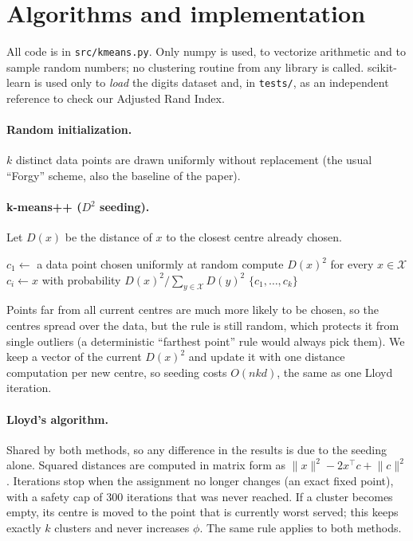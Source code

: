 \documentclass[11pt,a4paper]{article}
\begin{document}
\section{Algorithms and implementation}

All code is in \texttt{src/kmeans.py}. Only numpy is used, to vectorize
arithmetic and to sample random numbers; no clustering routine from any library
is called. scikit-learn is used only to \emph{load} the digits dataset and, in
\texttt{tests/}, as an independent reference to check our Adjusted Rand Index.

\paragraph{Random initialization.} $k$ distinct data points are drawn uniformly
without replacement (the usual ``Forgy'' scheme, also the baseline of the paper).

\paragraph{k-means++ ($D^2$ seeding).} Let $D(x)$ be the distance of $x$ to the
closest centre already chosen.
\begin{algorithm}[H]
\caption{$D^2$ seeding (k-means++)}
\begin{algorithmic}[1]
\State $c_1 \gets$ a data point chosen uniformly at random
  \State compute $D(x)^2$ for every $x\in\mathcal X$
  \State $c_i \gets x$ with probability $D(x)^2/\sum_{y\in\mathcal X} D(y)^2$
\EndFor
\State \Return $\{c_1,\dots,c_k\}$
\end{algorithmic}
\end{algorithm}
\noindent Points far from all current centres are much more likely to be chosen, so
the centres spread over the data, but the rule is still random, which protects it
from single outliers (a deterministic ``farthest point'' rule would always pick
them). We keep a vector of the current $D(x)^2$ and update it with one distance
computation per new centre, so seeding costs $O(nkd)$, the same as one Lloyd
iteration.

\paragraph{Lloyd's algorithm.} Shared by both methods, so any difference in the
results is due to the seeding alone. Squared distances are computed in matrix
form as $\lVert x\rVert^2-2x^\top c+\lVert c\rVert^2$. Iterations stop when the
assignment no longer changes (an exact fixed point), with a safety cap of 300
iterations that was never reached. If a cluster becomes empty, its centre is moved
to the point that is currently worst served; this keeps exactly $k$ clusters and
never increases $\phi$. The same rule applies to both methods.
\end{document}
